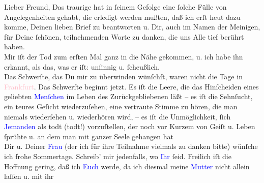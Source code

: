 \pstart{}Lieber Freund,\pend
\pstart
           Das traurige \label{K-L03254-1v}\label{K-L03254-1h} hat in ſeinem Gefolge eine ſolche Fülle von Angelegenheiten
               gehabt, die erledigt werden mußten, daß ich erſt heut
               dazu komme, Deinen lieben Brief zu beantworten u. Dir, auch im Namen der Meinigen,
               für Deine ſchönen, teilnehmenden Worte zu danken, die uns Alle tief berührt haben.
               {\\}Mir iſt der Tod zum erſten Mal ganz in die Nähe gekommen, {\pb}u. ich habe ihn erkannt, als das, was er iſt:
               unſinnig u. ſcheußlich. {\\}Das Schwerſte, das Du mir zu überwinden wünſchſt, waren
               nicht die Tage in \textcolor{pink}{Frankfurt}{}\ledrightnote{\textcolor{pink}{Frankfurt am Main}}. Das Schwerſte
               beginnt jetzt. Es iſt die Leere, die das Hinſcheiden eines geliebten \textcolor{blue}{Menſchen}{}\ledrightnote{{$\rightarrow$}\textcolor{blue}{Fedor Mamroth}} im Leben des
               Zurückgebliebenen läßt – es iſt die Sehnſucht, ein teures Geſicht wiederzuſehen, eine
               vertraute Stimme zu hören, die man niemals wiederſehen u.  wiederhören wird, – {\pb}es iſt die Unmöglichkeit, ſich \textcolor{blue}{Jemanden}{}\ledrightnote{{$\rightarrow$}\textcolor{blue}{Fedor Mamroth}} als todt (todt!) vorzuſtellen, der
               noch vor Kurzem von Geiſt u. Leben ſprühte u. an dem man mit ganzer Seele gehangen
                  hat{\dotsseven}{\\}Dir u. Deiner \textcolor{blue}{Frau}{}\ledrightnote{{$\rightarrow$}\textcolor{blue}{Olga Schnitzler}} (der
               ich für ihre Teilnahme vielmals zu danken bitte) wünſche ich frohe Sommertage.
               Schreib’ mir jedenfalls, wo \textcolor{blue}{Ihr}{}\ledrightnote{{$\rightarrow$}\textcolor{blue}{Olga Schnitzler}} ſeid. Freilich iſt die Hoffnung gering, daß ich \textcolor{blue}{Euch}{}\ledrightnote{{$\rightarrow$}\textcolor{blue}{Olga Schnitzler}}{ }\label{K-L03254-2v}\label{K-L03254-2h} werde, da ich diesmal meine \textcolor{blue}{Mutter}{}\ledrightnote{\textcolor{blue}{Clementine Goldmann}} nicht allein {\pb}laſſen u. mit ihr
